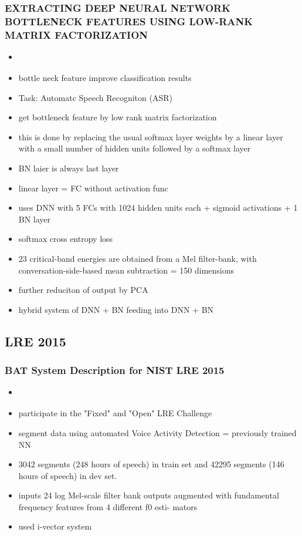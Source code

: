     \subsubsection{EXTRACTING DEEP NEURAL NETWORK BOTTLENECK FEATURES USING LOW-RANK MATRIX FACTORIZATION
    }
    \begin{itemize}
        \item \cite{zhang2014extracting}
        \item bottle neck feature improve classification results
        \item Task: Automatc Speech Recogniton (ASR)
        \item get bottleneck feature by low rank matrix factorization
        \item this is done by replacing the usual softmax layer weights by a linear layer with a small number of hidden units followed by a softmax layer
        \item BN laier is always last layer
        \item linear layer = FC without activation func
        \item uses DNN with 5 FCs with 1024 hidden units each + sigmoid activations + 1 BN layer
        \item softmax cross entropy loss 
        \item 23 critical-band energies are obtained from a Mel filter-bank, with conversation-side-based mean subtraction = 150 dimensions
        \item further reduciton of output by PCA
        \item hybrid system of DNN + BN feeding into DNN + BN
        
    \end{itemize}

\subsection{LRE 2015}

    \subsubsection{BAT System Description for NIST LRE 2015}
    \begin{itemize}
        \item \cite{plchot2016bat}
        \item participate in the "Fixed" and "Open" LRE Challenge
        \item segment data using automated Voice Activity Detection = previously trained NN
        \item 3042 segments (248 hours of speech) in train set and 42295 segments (146 hours of speech) in dev set.
        \item inputs 24 log Mel-scale filter bank outputs augmented with fundamental frequency features from 4 different f0 esti- mators
        \item used i-vector system
        
    \end{itemize}
    
